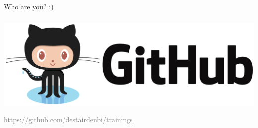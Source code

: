 \documentclass[x11names, svgnames]{beamer}
\begin{document}
\begin{frame}
  \frametitle{\one}
  \begin{center}
    Who are you? :)
  \end{center}
\end{frame}



%
%
%
\begin{frame}
  \frametitle{\two}
  \begin{center}
    \includegraphics[scale=0.1]{images/logo_github}
  \end{center}
  \begin{center}
    \footnotesize{\href{https://github.com/destairdenbi/trainings}{\textcolor{gray}{https://github.com/destairdenbi/trainings}}}
  \end{center}
\end{frame}
\end{document}

